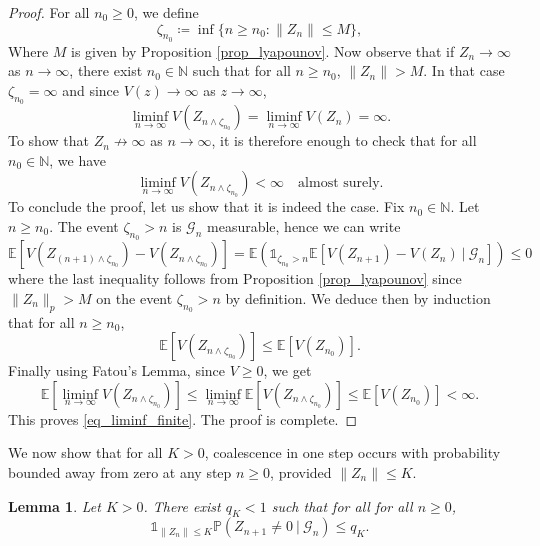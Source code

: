 \documentclass[a4paper, 11pt]{article}
\theoremstyle{plain}
\newtheorem{Lemma}[Theorem]{Lemma}
\theoremstyle{definition}
\newcommand{\E}{\mathbb{E}}
\newcommand{\N}{\mathbb{N}}
\renewcommand{\P}{\mathbb{P}}
\numberwithin{equation}{section}
\begin{document}
\begin{proof}
    For all $n_0\geq0$, we define
        \[\zeta_{n_0}\coloneqq\inf\{n\geq n_0:\|Z_n\|\leq M\},\]
    Where $M$ is given by Proposition \ref{prop_lyapounov}. Now observe that if $Z_n\to\infty$ as $n\to\infty$, there exist $n_0\in\N$ such that for all $n\geq n_0$, $\|Z_n\|>M$. In that case $\zeta_{n_0}=\infty$ and since $V(z)\to\infty$ as $z\to\infty$, 
        \[\liminf_{n\to\infty} V(Z_{n\wedge\zeta_{n_0}})=\liminf_{n\to\infty} V(Z_n)=\infty.\]
    To show that $Z_n\not\to\infty$ as $n\to\infty$, it is therefore enough to check that for all $n_0\in\N$, we have
        \begin{equation}
            \label{eq_liminf_finite}
            \liminf_{n\to\infty} V(Z_{n\wedge\zeta_{n_0}})<\infty\quad\text{almost surely}.
        \end{equation}
    To conclude the proof, let us show that it is indeed the case. Fix $n_0\in\N$. Let $n\geq n_0$. The event $\zeta_{n_0}>n$ is $\mathcal G_n$ measurable, hence we can write
        \begin{equation*}
            \E[V(Z_{(n+1)\wedge\zeta_{n_0}})-V(Z_{n\wedge\zeta_{n_0}})]=\E(\mathds 1_{\zeta_{n_0}>n}\E[V(Z_{n+1})-V(Z_n)~\vert~\mathcal G_n])\leq0
        \end{equation*}
    where the last inequality follows from Proposition \ref{prop_lyapounov} since $\|Z_n\|_p>M$ on the event $\zeta_{n_0}>n$ by definition. We deduce then by induction that for all $n\geq n_0$,
        \[\E[V(Z_{n\wedge\zeta_{n_0}})]\leq\E[V(Z_{n_0})].\]
    Finally using Fatou's Lemma, since $V\geq 0$, we get
        \[\E\left[\liminf_{n\to\infty}V(Z_{n\wedge\zeta_{n_0}})\right]\leq\liminf_{n\to\infty}\E[V(Z_{n\wedge\zeta_{n_0}})]\leq\E[V(Z_{n_0})]<\infty.\]
    This proves \eqref{eq_liminf_finite}. The proof is complete.
\end{proof}


We now show that for all $K>0$, coalescence in one step occurs with probability bounded away from zero at any step $n\geq 0$, provided $\|Z_n\|\leq K$.


\begin{Lemma}
    \label{lemma_coalescence_proba}
    Let $K>0$. There exist $q_K<1$ such that for all for all $n\geq 0$,
        \[\mathds 1_{\|Z_n\|\leq K}\P(Z_{n+1}\neq0~\vert~\mathcal G_n)\leq q_K.\]
\end{Lemma}
\end{document}
